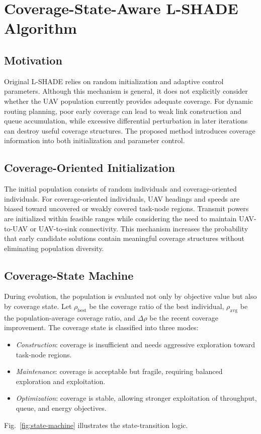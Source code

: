 \documentclass[lettersize,journal]{IEEEtran}
\begin{document}
\section{Coverage-State-Aware L-SHADE Algorithm}
\subsection{Motivation}
Original L-SHADE relies on random initialization and adaptive control parameters. Although this mechanism is general, it does not explicitly consider whether the UAV population currently provides adequate coverage. For dynamic routing planning, poor early coverage can lead to weak link construction and queue accumulation, while excessive differential perturbation in later iterations can destroy useful coverage structures. The proposed method introduces coverage information into both initialization and parameter control.

\subsection{Coverage-Oriented Initialization}
The initial population consists of random individuals and coverage-oriented individuals. For coverage-oriented individuals, UAV headings and speeds are biased toward uncovered or weakly covered task-node regions. Transmit powers are initialized within feasible ranges while considering the need to maintain UAV-to-UAV or UAV-to-sink connectivity. This mechanism increases the probability that early candidate solutions contain meaningful coverage structures without eliminating population diversity.

\subsection{Coverage-State Machine}
During evolution, the population is evaluated not only by objective value but also by coverage state. Let $\rho_{\mathrm{best}}$ be the coverage ratio of the best individual, $\rho_{\mathrm{avg}}$ be the population-average coverage ratio, and $\Delta\rho$ be the recent coverage improvement. The coverage state is classified into three modes:
\begin{itemize}
  \item \emph{Construction}: coverage is insufficient and needs aggressive exploration toward task-node regions.
  \item \emph{Maintenance}: coverage is acceptable but fragile, requiring balanced exploration and exploitation.
  \item \emph{Optimization}: coverage is stable, allowing stronger exploitation of throughput, queue, and energy objectives.
\end{itemize}
Fig.~\ref{fig:state-machine} illustrates the state-transition logic.
\end{document}
